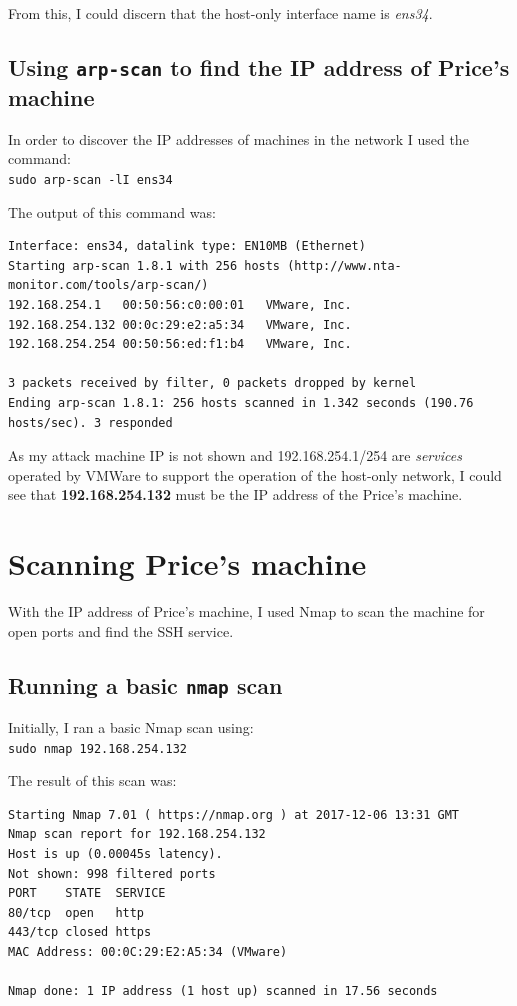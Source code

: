 \documentclass[12pt]{report}
\newcommand{\term}[1]{\colorbox{light-gray}{\texttt{#1}}}
\begin{document}
From this, I could discern that the host-only interface name is \textit{ens34}.

\subsection*{Using \texttt{arp-scan} to find the IP address of Price's machine}
In order to discover the IP addresses of machines in the network I used the command:\\
\term{sudo arp-scan -lI ens34}

The output of this command was:
\begin{Verbatim}[frame=leftline, fontsize=\small]
Interface: ens34, datalink type: EN10MB (Ethernet)
Starting arp-scan 1.8.1 with 256 hosts (http://www.nta-monitor.com/tools/arp-scan/)
192.168.254.1	00:50:56:c0:00:01	VMware, Inc.
192.168.254.132	00:0c:29:e2:a5:34	VMware, Inc.
192.168.254.254	00:50:56:ed:f1:b4	VMware, Inc.

3 packets received by filter, 0 packets dropped by kernel
Ending arp-scan 1.8.1: 256 hosts scanned in 1.342 seconds (190.76 hosts/sec). 3 responded
\end{Verbatim}

As my attack machine IP is not shown and 192.168.254.1/254 are \textit{services} operated by VMWare to support the operation of the host-only network, I could see that \textbf{192.168.254.132} must be the IP address of the Price's machine.


\section{Scanning Price's machine}
With the IP address of Price's machine, I used Nmap to scan the machine for open ports and find the SSH service.
\subsection*{Running a basic \texttt{nmap} scan}
Initially, I ran a basic Nmap scan using:\\
\term{sudo nmap 192.168.254.132}

The result of this scan was:
\begin{Verbatim}[frame=leftline]
Starting Nmap 7.01 ( https://nmap.org ) at 2017-12-06 13:31 GMT
Nmap scan report for 192.168.254.132
Host is up (0.00045s latency).
Not shown: 998 filtered ports
PORT    STATE  SERVICE
80/tcp  open   http
443/tcp closed https
MAC Address: 00:0C:29:E2:A5:34 (VMware)

Nmap done: 1 IP address (1 host up) scanned in 17.56 seconds
\end{Verbatim}
\end{document}
